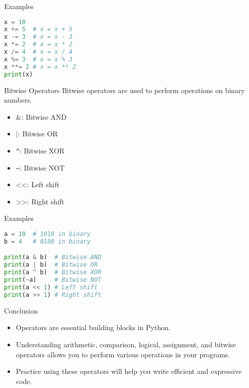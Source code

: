\begin{frame}[fragile]{Examples}
\begin{lstlisting}[language=python]
x = 10
x += 5  # x = x + 5
x -= 3  # x = x - 3
x *= 2  # x = x * 2
x /= 4  # x = x / 4
x %= 3  # x = x % 3
x **= 2 # x = x ** 2
print(x)
\end{lstlisting}
\end{frame}


\begin{frame}{Bitwise Operators}
Bitwise operators are used to perform operations on binary numbers.
\begin{itemize}
    \item \(\texttt{\&}\): Bitwise AND
    \item \(\texttt{|}\): Bitwise OR
    \item \texttt{\textasciicircum}: Bitwise XOR
    \item \texttt{\textasciitilde}: Bitwise NOT
    \item \(\texttt{<<}\): Left shift
    \item \(\texttt{>>}\): Right shift
\end{itemize}
\end{frame}

\begin{frame}[fragile]{Examples}
\begin{lstlisting}[language=python]
a = 10  # 1010 in binary
b = 4   # 0100 in binary

print(a & b)  # Bitwise AND
print(a | b)  # Bitwise OR
print(a ^ b)  # Bitwise XOR
print(~a)     # Bitwise NOT
print(a << 1) # Left shift
print(a >> 1) # Right shift
\end{lstlisting}
\end{frame}

\begin{frame}{Conclusion}
\begin{itemize}
    \item Operators are essential building blocks in Python.
    \item Understanding arithmetic, comparison, logical, assignment, and bitwise operators allows you to perform various operations in your programs.
    \item Practice using these operators will help you write efficient and expressive code.
\end{itemize}
\end{frame}


